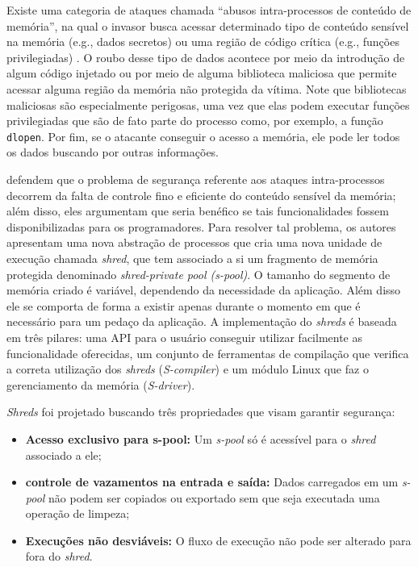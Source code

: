Existe uma categoria de ataques chamada ``abusos intra-processos de conteúdo
de memória'', na qual o invasor busca acessar determinado tipo de conteúdo
sensível na memória (e.g., dados secretos) ou uma região de código crítica
(e.g., funções privilegiadas) \citep{shreds}. O roubo desse tipo de dados
acontece por meio da introdução de algum código injetado ou por meio de alguma
biblioteca maliciosa que permite acessar alguma região da memória não protegida
da vítima. Note que bibliotecas maliciosas são especialmente perigosas, uma vez
que elas podem executar funções privilegiadas que são de fato parte do
processo como, por exemplo, a função \texttt{dlopen}. Por fim, se o atacante
conseguir o acesso a memória, ele pode ler todos os dados buscando por outras
informações.

\citet{shreds} defendem que o problema de segurança referente aos ataques
intra-processos decorrem da falta de controle fino e eficiente do conteúdo
sensível da memória; além disso, eles argumentam que seria benéfico se tais
funcionalidades fossem disponibilizadas para os programadores. Para resolver tal
problema, os autores apresentam uma nova abstração de processos que cria uma
nova unidade de execução chamada \emph{shred}, que tem associado a si um
fragmento de memória protegida denominado \emph{shred-private pool
(s-pool)}. O tamanho do segmento de memória criado é variável,
dependendo da necessidade da aplicação. Além disso ele se comporta de forma a
existir apenas durante o momento em que é necessário para um pedaço da
aplicação. A implementação do \emph{shreds} é baseada em três pilares: uma API
para o usuário conseguir utilizar facilmente as funcionalidade oferecidas, um
conjunto de ferramentas de compilação que verifica a correta utilização dos
\emph{shreds} (\emph{S-compiler}) e um módulo Linux que faz o gerenciamento da
memória (\emph{S-driver}).

\emph{Shreds} foi projetado buscando três propriedades que visam garantir
segurança:

\begin{itemize}
  \item \textbf{Acesso exclusivo para s-pool:} Um \emph{s-pool} só é acessível
        para o \emph{shred} associado a ele;
  \item \textbf{controle de vazamentos na entrada e saída:} Dados carregados em um
        \emph{s-pool} não podem ser copiados ou exportado sem que seja
        executada uma operação de limpeza;
  \item \textbf{Execuções não desviáveis:} O fluxo de execução não pode ser
        alterado para fora do \emph{shred}.
\end{itemize}

